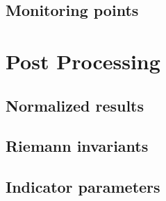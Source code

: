 \subsection{Monitoring points}\label{monitoring-points}

\section{Post Processing}\label{post-processing}

\subsection{Normalized results}\label{normalized-results}

\subsection{Riemann invariants}\label{riemann-invariants}

\subsection{Indicator parameters}\label{indicator-parameters}
